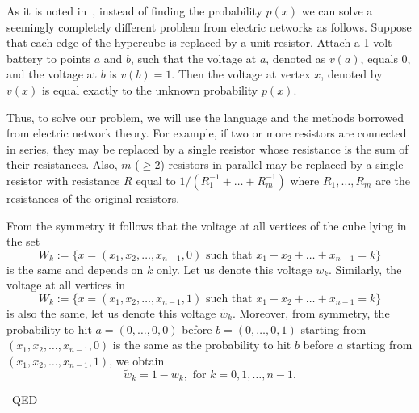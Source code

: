 \documentclass[12pt]{article}
\newenvironment{proof}{{\sc Proof:}}{~\hfill QED}
\begin{document}
\begin{proof}
As it is noted in~\cite{DS}, instead of finding the probability
$p(x)$ we can solve a seemingly completely different problem from
electric networks as follows. Suppose that each edge of the
hypercube is replaced by a unit resistor. Attach a 1 volt battery
to points $a$ and $b$, such that the voltage at $a$, denoted as
$v(a)$, equals $0$, and the voltage at $b$ is $v(b)=1$. Then the
voltage at vertex $x$, denoted by $v(x)$ is equal exactly to  the
unknown probability $p(x)$.

Thus, to solve our problem, we will use the language and the
methods borrowed from electric network theory. For example, if two
or more resistors are connected in series, they may be replaced by
a single resistor whose resistance is the sum of their
resistances. Also, $m$ ($\ge 2$) resistors in parallel may be
replaced by a single resistor with resistance $R$ equal to
$1/(R_1^{-1}+\dots+R_m^{-1})$ where $R_1,\dots,R_m$ are the
resistances of the original resistors.

From the symmetry it follows that the voltage at all vertices of
the cube lying in the set
$$
W_k:=\{x=(x_1,x_2,\dots,x_{n-1},0) \mbox{ such that }
 x_1+x_2+\dots+x_{n-1}=k \}
$$
is the same and depends on $k$ only. Let us denote this voltage
$w_k$. Similarly, the voltage at all vertices in
$$
W_k:=\{x=(x_1,x_2,\dots,x_{n-1},1) \mbox{ such that }
 x_1+x_2+\dots+x_{n-1}=k \}
$$
is also the same, let us denote this voltage $\tilde w_k$.
Moreover, from symmetry, the probability to hit $a=(0,\dots,0,0)$
before $b=(0,\dots,0,1)$ starting from $(x_1,x_2,\dots,x_{n-1},0)$
is the same as the probability to hit $b$ before $a$ starting from
$(x_1,x_2,\dots,x_{n-1},1)$, we obtain
\begin{equation}\label{eqtil}
\tilde w_k=1-w_k, \mbox{ for } k=0,1,\dots,n-1.
\end{equation}


\end{proof}
\end{document}
